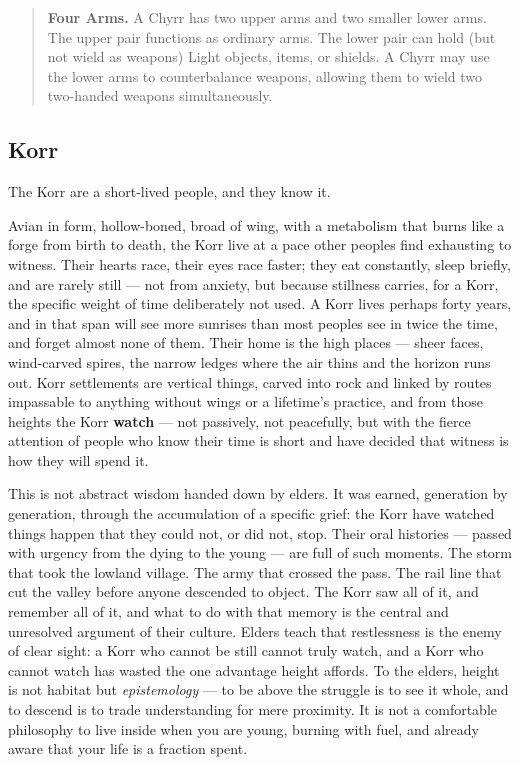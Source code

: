 \begin{quote}
\textbf{Four Arms.} A Chyrr has two upper arms and two smaller lower arms. The upper pair functions as ordinary arms. The lower pair can hold (but not wield as weapons) Light objects, items, or shields. A Chyrr may use the lower arms to counterbalance weapons, allowing them to wield two two-handed weapons simultaneously.
\end{quote}

\subsection{Korr}

The Korr are a short-lived people, and they know it.

Avian in form, hollow-boned, broad of wing, with a metabolism that burns like a forge from birth to death, the Korr live at a pace other peoples find exhausting to witness. Their hearts race, their eyes race faster; they eat constantly, sleep briefly, and are rarely still --- not from anxiety, but because stillness carries, for a Korr, the specific weight of time deliberately not used. A Korr lives perhaps forty years, and in that span will see more sunrises than most peoples see in twice the time, and forget almost none of them. Their home is the high places --- sheer faces, wind-carved spires, the narrow ledges where the air thins and the horizon runs out. Korr settlements are vertical things, carved into rock and linked by routes impassable to anything without wings or a lifetime's practice, and from those heights the Korr \textbf{watch} --- not passively, not peacefully, but with the fierce attention of people who know their time is short and have decided that witness is how they will spend it.

This is not abstract wisdom handed down by elders. It was earned, generation by generation, through the accumulation of a specific grief: the Korr have watched things happen that they could not, or did not, stop. Their oral histories --- passed with urgency from the dying to the young --- are full of such moments. The storm that took the lowland village. The army that crossed the pass. The rail line that cut the valley before anyone descended to object. The Korr saw all of it, and remember all of it, and what to do with that memory is the central and unresolved argument of their culture. Elders teach that restlessness is the enemy of clear sight: a Korr who cannot be still cannot truly watch, and a Korr who cannot watch has wasted the one advantage height affords. To the elders, height is not habitat but \textit{epistemology} --- to be above the struggle is to see it whole, and to descend is to trade understanding for mere proximity. It is not a comfortable philosophy to live inside when you are young, burning with fuel, and already aware that your life is a fraction spent.

